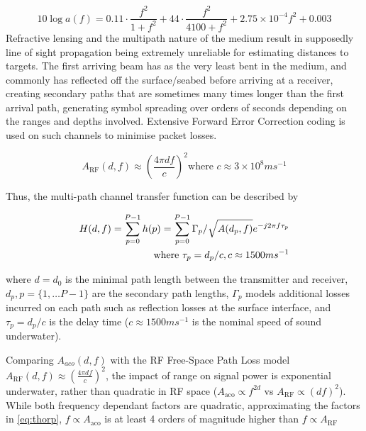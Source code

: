  \begin{equation}
 \label{eq:thorp}
 10 \log a(f) = 0.11 \cdot \frac{f^2}{1+f^2} + 44\cdot\frac{f^2}{4100+f^2}+ 2.75\times10^{-4} f^2 + 0.003
 \end{equation}
 Refractive lensing and the multipath nature of the medium result in supposedly line of sight propagation being extremely unreliable for estimating distances to targets.
 The first arriving beam has as the very least bent in the medium, and commonly has reflected off the surface/seabed before arriving at a receiver, creating secondary paths that are sometimes many times longer than the first arrival path, generating symbol spreading over orders of seconds depending on the ranges and depths involved.
 Extensive Forward Error Correction coding is used on such channels to minimise packet losses.
 
 \begin{equation}
 \label{eq:fspl}
 A_{\text{RF}}(d,f) \approx \left( \frac{4\pi d f}{c} \right)^2
 \text{where }c\approx 3\times10^8ms^{-1}
 \end{equation}
 
 Thus, the multi-path channel transfer function can be described by 
 
 \begin{align}
 \label{eq:acomultipath}
 H(d,f) =\sum_{p=0}^{P-1} h(p) = \sum_{p=0}^{P-1} \Gamma_p / \sqrt{A(d_p,f)}e^{-j 2 \pi f \tau_p} \\
 \text{where } \tau_p = d_p/c, c \approx 1500 ms^{-1} \notag
 \end{align}
 
 where $d=d_0$ is the minimal path length between the transmitter and receiver, $d_p,p=\{1,\dots P-1\}$ are the secondary path lengths, $\Gamma_p$ models additional losses incurred on each path such as reflection losses at the surface interface, and $\tau_p = d_p/c$ is the delay time ($c \approx 1500 ms^{-1}$ is the nominal speed of sound underwater).
 
 
 Comparing $A_{aco}(d,f)$ with the RF Free-Space Path Loss model $A_{\text{RF}}(d,f) \approx \left( \frac{4\pi d f}{c} \right)^2$, the impact of range on signal power is exponential underwater, rather than quadratic in RF space ($A_{\text{aco}} \propto f^{2d}$ vs $A_{\text{RF}} \propto (df)^2$).
 While both frequency dependant factors are quadratic, approximating the factors in \eqref{eq:thorp}, $f\propto A_{\text{aco}}$ is at least 4 orders of magnitude higher than $f\propto A_{\text{RF}}$
 
